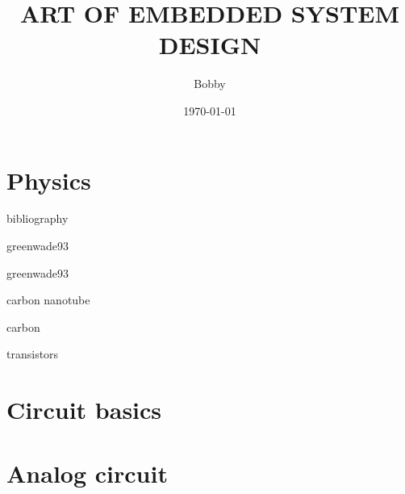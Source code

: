 \documentclass[UTF8]{book}
\title{ART OF EMBEDDED SYSTEM DESIGN }
\author{Bobby}
\date{\today}
\begin{document}
	\maketitle
	\frontmatter
	

	\tableofcontents
	
	\mainmatter
	\part{Physics}
	\label{Physics}
	

	\begin{comment} 
	\chapter{Solid state physics}
	\label{Solid state physics}
	\chapter{Semiconductor physics}
	\label{Semiconductor physics}
	\end{comment}


	bibliography

	greenwade93\cite{greenwade93}

	greenwade93\cite{Xarticle}

	carbon nanotube\cite{dreyer2010chemistry}

	carbon\cite{geim2007rise}

	transistors\cite{novoselov2005two}


	
	
	\part{Circuit basics}
	\label{Circuit basics}
	
	
	\part{Analog circuit}
	\label{Analog circuit}
	
\end{document}
